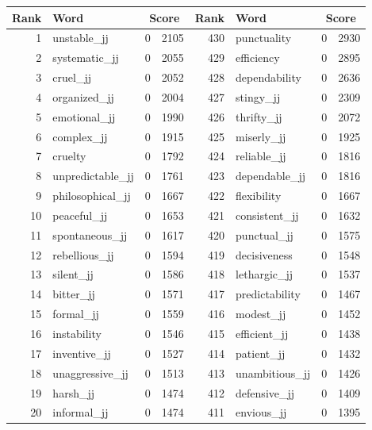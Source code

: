\begin{table}[tbp]
    \begin{tabular}{| rlr@{.}l | rlr@{.}l |}
    \hline
    \textbf{Rank} & \textbf{Word} & \multicolumn{2}{c|}{\textbf{Score}} & \textbf{Rank} & \textbf{Word} & \multicolumn{2}{c|}{\textbf{Score}} \\
    \hline
    1 & unstable\_jj & 0 & 2105    &    430 & punctuality & 0 & 2930 \\
    2 & systematic\_jj & 0 & 2055    &    429 & efficiency & 0 & 2895 \\
    3 & cruel\_jj & 0 & 2052    &    428 & dependability & 0 & 2636 \\
    4 & organized\_jj & 0 & 2004    &    427 & stingy\_jj & 0 & 2309 \\
    5 & emotional\_jj & 0 & 1990    &    426 & thrifty\_jj & 0 & 2072 \\
    6 & complex\_jj & 0 & 1915    &    425 & miserly\_jj & 0 & 1925 \\
    7 & cruelty & 0 & 1792    &    424 & reliable\_jj & 0 & 1816 \\
    8 & unpredictable\_jj & 0 & 1761    &    423 & dependable\_jj & 0 & 1816 \\
    9 & philosophical\_jj & 0 & 1667    &    422 & flexibility & 0 & 1667 \\
    10 & peaceful\_jj & 0 & 1653    &    421 & consistent\_jj & 0 & 1632 \\
    11 & spontaneous\_jj & 0 & 1617    &    420 & punctual\_jj & 0 & 1575 \\
    12 & rebellious\_jj & 0 & 1594    &    419 & decisiveness & 0 & 1548 \\
    13 & silent\_jj & 0 & 1586    &    418 & lethargic\_jj & 0 & 1537 \\
    14 & bitter\_jj & 0 & 1571    &    417 & predictability & 0 & 1467 \\
    15 & formal\_jj & 0 & 1559    &    416 & modest\_jj & 0 & 1452 \\
    16 & instability & 0 & 1546    &    415 & efficient\_jj & 0 & 1438 \\
    17 & inventive\_jj & 0 & 1527    &    414 & patient\_jj & 0 & 1432 \\
    18 & unaggressive\_jj & 0 & 1513    &    413 & unambitious\_jj & 0 & 1426 \\
    19 & harsh\_jj & 0 & 1474    &    412 & defensive\_jj & 0 & 1409 \\
    20 & informal\_jj & 0 & 1474    &    411 & envious\_jj & 0 & 1395 \\

\end{tabular}
\end{table}
